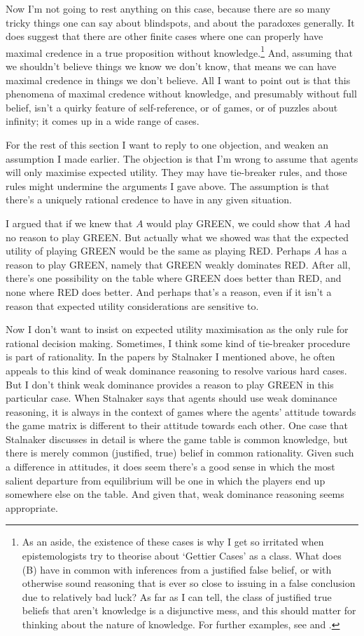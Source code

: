 Now I'm not going to rest anything on this case, because there are so many tricky things one can say about blindspots, and about the paradoxes generally. It does suggest that there are other finite cases where one can properly have maximal credence in a true proposition without knowledge.\footnote{As an aside, the existence of these cases is why I get so irritated when epistemologists try to theorise about `Gettier Cases' as a class. What does (B) have in common with inferences from a justified false belief, or with otherwise sound reasoning that is ever so close to issuing in a false conclusion due to relatively bad luck? As far as I can tell, the class of justified true beliefs that aren't knowledge is a disjunctive mess, and this should matter for thinking about the nature of knowledge. For further examples, see \cite{WilliamsonLofoten} and \cite{Nagel2013-Williamson}.} And, assuming that we shouldn't believe things we know we don't know, that means we can have maximal credence in things we don't believe. All I want to point out is that this phenomena of maximal credence without knowledge, and presumably without full belief, isn't a quirky feature of self-reference, or of games, or of puzzles about infinity; it comes up in a wide range of cases.

For the rest of this section I want to reply to one objection, and weaken an assumption I made earlier. The objection is that I'm wrong to assume that agents will only maximise expected utility. They may have tie-breaker rules, and those rules might undermine the arguments I gave above. The assumption is that there's a uniquely rational credence to have in any given situation.

I argued that if we knew that $A$ would play GREEN, we could show that $A$ had no reason to play GREEN. But actually what we showed was that the expected utility of playing GREEN would be the same as playing RED. Perhaps $A$ has a reason to play GREEN, namely that GREEN weakly dominates RED. After all, there's one possibility on the table where GREEN does better than RED, and none where RED does better. And perhaps that's a reason, even if it isn't a reason that expected utility considerations are sensitive to.

Now I don't want to insist on expected utility maximisation as the only rule for rational decision making. Sometimes, I think some kind of tie-breaker procedure is part of rationality. In the papers by Stalnaker I mentioned above, he often appeals to this kind of weak dominance reasoning to resolve various hard cases. But I don't think weak dominance provides a reason to play GREEN in this particular case. When Stalnaker says that agents should use weak dominance reasoning, it is always in the context of games where the agents' attitude towards the game matrix is different to their attitude towards each other. One case that Stalnaker discusses in detail is where the game table is common knowledge, but there is merely common (justified, true) belief in common rationality. Given such a difference in attitudes, it does seem there's a good sense in which the most salient departure from equilibrium will be one in which the players end up somewhere else on the table. And given that, weak dominance reasoning seems appropriate.

